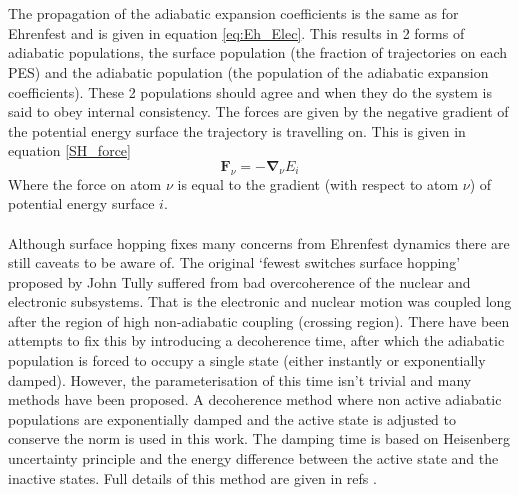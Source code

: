 \\\\
The propagation of the adiabatic expansion coefficients is the same as for Ehrenfest and is given in equation \eqref{eq:Eh_Elec}. This results in 2 forms of adiabatic populations, the surface population (the fraction of trajectories on each PES) and the adiabatic population (the population of the adiabatic expansion coefficients). These 2 populations should agree and when they do the system is said to obey internal consistency. The forces are given by the negative gradient of the potential energy surface the trajectory is travelling on. This is given in equation \eqref{SH_force}
\begin{equation}
  \mathbf{F}_{\nu} = -\mathbf{\nabla}_{\nu} E_{i} 
  \label{eq:SH_force}
\end{equation}
Where the force on atom $\nu$ is equal to the gradient (with respect to atom $\nu$) of potential energy surface $i$.
\\\\
Although surface hopping fixes many concerns from Ehrenfest dynamics there are still caveats to be aware of. The original `fewest switches surface hopping' proposed by John Tully suffered from bad overcoherence of the nuclear and electronic subsystems. That is the electronic and nuclear motion was coupled long after the region of high non-adiabatic coupling (crossing region). There have been attempts to fix this by introducing a decoherence time, after which the adiabatic population is forced to occupy a single state (either instantly or exponentially damped). However, the parameterisation of this time isn't trivial and many methods have been proposed. A decoherence method where non active adiabatic populations are exponentially damped and the active state is adjusted to conserve the norm is used in this work. The damping time is based on Heisenberg uncertainty principle and the energy difference between the active state and the inactive states. Full details of this method are given in refs \cite{Giannini2018Crossover, Carof2017FSSH}.
\\\\
